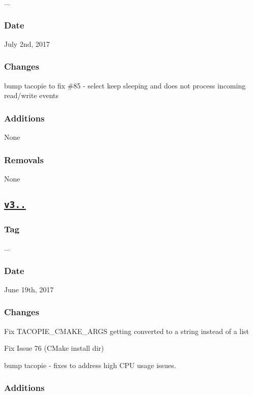 {..}. \subsubsection*{Date}

July 2nd, 2017 \subsubsection*{Changes}


\begin{DoxyItemize}
\item bump tacopie to fix \#85 -\/ select keep sleeping and does not process incoming read/write events \subsubsection*{Additions}
\end{DoxyItemize}

None \subsubsection*{Removals}

None

\subsection*{\href{https://github.com/Cylix/cpp_redis/releases/tag/3.5.2}{\tt v3..}}

\subsubsection*{Tag}

{..}. \subsubsection*{Date}

June 19th, 2017 \subsubsection*{Changes}


\begin{DoxyItemize}
\item Fix T\+A\+C\+O\+P\+I\+E\+\_\+\+C\+M\+A\+K\+E\+\_\+\+A\+R\+GS getting converted to a string instead of a list
\item Fix Issue 76 (C\+Make install dir)
\item bump tacopie -\/ fixes to address high C\+PU usage issues. \subsubsection*{Additions}
\end{DoxyItemize}


